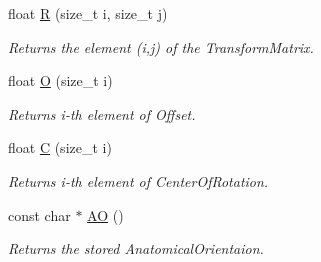 \begin{DoxyCompactItemize}
float \hyperlink{classMhd_1_1MhdOrientation_aa10921828b2a4083708acf5a3d8aef51}{\-R} (size\-\_\-t i, size\-\_\-t j)
\begin{DoxyCompactList}\small\item\em \-Returns the element (i,j) of the \-Transform\-Matrix. \end{DoxyCompactList}\item 
float \hyperlink{classMhd_1_1MhdOrientation_ace88d015f223090979527ee691b11d9c}{\-O} (size\-\_\-t i)
\begin{DoxyCompactList}\small\item\em \-Returns i-\/th element of \-Offset. \end{DoxyCompactList}\item 
float \hyperlink{classMhd_1_1MhdOrientation_aa9e653cac26a97723f8848a9e55fa578}{\-C} (size\-\_\-t i)
\begin{DoxyCompactList}\small\item\em \-Returns i-\/th element of \-Center\-Of\-Rotation. \end{DoxyCompactList}\item 
const char $\ast$ \hyperlink{classMhd_1_1MhdOrientation_a4089d58c8a1cd24e692de3fdf603fb11}{\-A\-O} ()
\begin{DoxyCompactList}\small\item\em \-Returns the stored \-Anatomical\-Orientaion. \end{DoxyCompactList}\end{DoxyCompactItemize}
